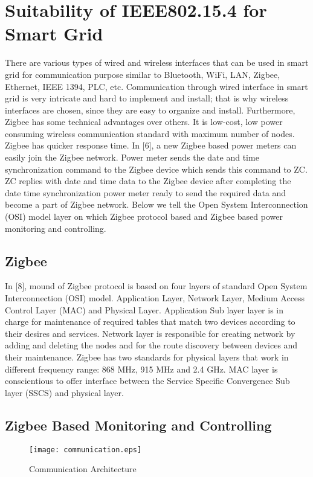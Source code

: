 \documentclass[10pt, conference, compsocconf]{IEEEtran}
\begin{document}
\section{Suitability of IEEE802.15.4 for Smart Grid}
There are various  types of wired and wireless interfaces that can be used in smart grid for communication purpose similar to Bluetooth, WiFi, LAN, Zigbee, Ethernet, IEEE 1394, PLC, etc. Communication through wired interface in smart grid is very intricate and hard to implement and install; that is why wireless interfaces are chosen, since they are easy to organize and install. Furthermore, Zigbee has some technical advantages over others. It is low-cost, low power consuming wireless communication standard with maximum number of nodes. Zigbee has quicker response time. In [6], a new Zigbee based  power meters can easily join the Zigbee network. Power meter sends the date and time synchronization command to the Zigbee device which sends this command to ZC. ZC replies with date and time data to the Zigbee device after completing the date time synchronization power meter ready to send the required data and become a part of Zigbee network. Below we tell the Open System Interconnection (OSI) model layer on which Zigbee protocol based and Zigbee based power monitoring and controlling.

\subsection{Zigbee}
In [8], mound of Zigbee protocol is based on four layers of standard Open System Interconnection (OSI) model. Application Layer, Network Layer, Medium Access Control Layer (MAC) and Physical Layer. Application Sub layer layer is in charge for maintenance of required tables that match two devices according to their desires and services. Network layer is responsible for creating network by adding and deleting the nodes and for the route discovery between devices and their maintenance. Zigbee has two standards for physical layers that work in different frequency range: 868 MHz, 915 MHz and 2.4 GHz. MAC layer is conscientious to offer interface between the Service Specific Convergence Sub layer (SSCS) and physical layer.


\subsection{Zigbee Based Monitoring and Controlling}

 \begin{figure*}[t]
\centering
  \texttt{[image: communication.eps]}
  \caption{Communication Architecture}
\end{figure*}
\end{document}
